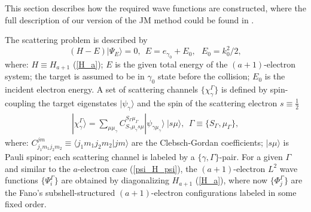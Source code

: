 \documentclass[aip
, pra
, showpacs
, aps
, twocolumn
, groupedaddress
, floatfix
]{revtex4}
\newcommand{\beq}{\begin{equation}}
\newcommand{\eeq}{\end{equation}}
\newcommand{\barr}{\begin{array}}
\newcommand{\earr}{\end{array}}
\begin{document}
This section describes how the required wave functions are constructed, where
the full description of our version of the JM method could be found in \cite{KB10p022708, KFB11}.



The scattering problem is described by
\[ (H - E) | \Psi_E \rangle = 0, \ \ E = e_{\gamma_0} + E_0, \ \ \ E_0 = k_0^2/2, \]
where: $H\equiv H_{a+1}$ (\ref{H_a}); $E$ is the given total energy of the $(a+1)$-electron system;
the target is assumed to be in $\gamma_0$ state before the collision;
$E_0$ is the incident electron energy.
A set of scattering channels $\{ \chi_{\gamma}^{\Gamma} \}$ is defined \cite{BR76p1491,KFB11} by
spin-coupling the target eigenstates $|\psi_{\gamma} \rangle$ and the spin of the scattering electron
$s\equiv \frac{1}{2}$
\beq \barr{l}
| \chi_{\gamma}^{\Gamma} \rangle = \sum_{\mu \mu_\gamma}
C_{S_\gamma \mu_\gamma s \mu}^{S_\Gamma \mu_\Gamma}
|\psi_{\gamma \mu_\gamma} \rangle \ |s \mu  \rangle, \ \ \Gamma \equiv \{S_\Gamma,\mu_\Gamma\},
\earr \label{psi_phi_Gamma}
\eeq
where: $C_{j_1m_1j_2m_2}^{jm} \equiv \langle j_1m_1 j_2 m_2| jm\rangle$ are the Clebsch-Gordan coefficients; $|s \mu \rangle$ is Pauli spinor;
each scattering channel is labeled by a $\{\gamma, \Gamma\}$-pair.
For a given $\Gamma$ and similar to the $a$-electron case (\ref{psi_H_psi}), the $(a+1)$-electron $L^2$ wave functions $\{ \Psi_i^\Gamma \}$
are obtained by diagonalizing $H_{a+1}$ (\ref{H_a}),
where now $\{ \Phi_j^\Gamma \}$ are the Fano's \cite{Fano65,KFB11} subshell-structured $(a+1)$-electron configurations
labeled in some fixed order.
\end{document}
